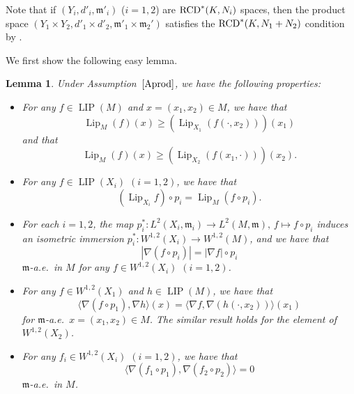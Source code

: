\documentclass[pdftex]{sigma}
\numberwithin{equation}{section}
\newtheorem{Lem}[Thm]{Lemma}
\theoremstyle{definition}
\newcommand{\LIP}{\operatorname{LIP}}
\newcommand{\Lip}{\operatorname{Lip}}
\newcommand{\mf}{\mathfrak{m}}
\newcommand{\RCD}{{\rm RCD}^\ast}
\begin{document}
Note that if $(Y_i,d'_i,\mf'_i)$ ($i=1,2$) are $\RCD(K,N_i)$ spaces, then the product space
$(Y_1\times Y_2,\allowbreak d'_1\times d'_2,\mf'_1\times \mf_2')$ satisfies the $\RCD(K,N_1+N_2)$ condition by \cite[Theorem~3.23]{EKS}.

We first show the following easy lemma.
\begin{Lem}\label{prsb}
Under Assumption~$\ref{Aprod}$, we have the following properties:
\begin{itemize}\itemsep=0pt
\item[$(i)$] For any $f\in \LIP(M)$ and $x=(x_1,x_2)\in M$, we have that
\[
\Lip_M(f)(x)\geq \left(\Lip_{X_1} (f(\cdot,x_2))\right)(x_1)
\]
and that
\[
\Lip_M(f)(x)\geq \left(\Lip_{X_2} (f(x_1,\cdot))\right)(x_2).
\]
\item[$(ii)$] For any $f\in \LIP(X_i)$ $(i=1,2)$, we have that
\[
(\Lip_{X_i} f)\circ p_i=\Lip_M (f\circ p_i).
\]
\item[$(iii)$] For each $i=1,2$, the map $p_i^\ast\colon L^2(X_i,\mf_i)\to L^2(M,\mf),\,f\mapsto f\circ p_i$ induces an isometric immersion $p_i^\ast \colon W^{1,2}(X_i)\to W^{1,2}(M)$,
and we have that
\[
|\nabla (f\circ p_i)|=|\nabla f|\circ p_i
\]
$\mf$-a.e.\ in $M$ for any $f\in W^{1,2}(X_i)$ $(i=1,2)$.
\item[$(iv)$] For any $f\in W^{1,2}(X_1)$ and $h\in \LIP(M)$, we have that
\[
\langle\nabla (f\circ p_1),\nabla h\rangle(x)=\langle\nabla f,\nabla (h(\cdot,x_2))\rangle(x_1)
\]
for $\mf$-a.e.\ $x=(x_1,x_2)\in M$.
The similar result holds for the element of $W^{1,2}(X_2)$.
\item[$(v)$] For any $f_i\in W^{1,2}(X_i)$ $(i=1,2)$, we have that
\[
\langle\nabla (f_1\circ p_1),\nabla (f_2\circ p_2)\rangle=0
\]
$\mf$-a.e.\ in $M$.
\end{itemize}
\end{Lem}
\end{document}
